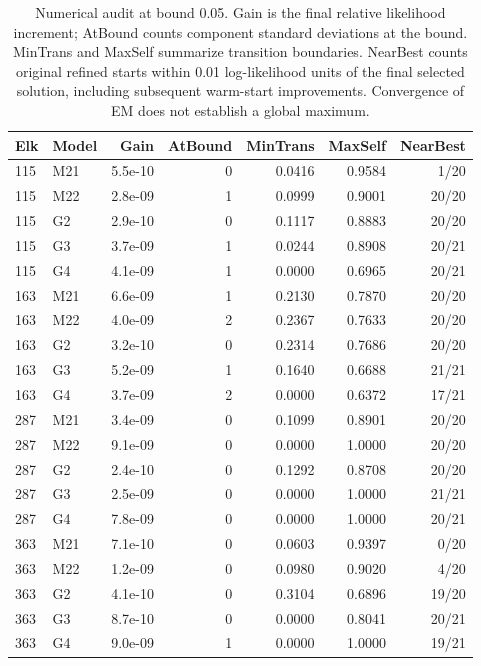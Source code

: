 \begin{table}[tbp]
\centering\small
\caption{Numerical audit at bound 0.05. Gain is the final relative likelihood increment; AtBound counts component standard deviations at the bound. MinTrans and MaxSelf summarize transition boundaries. NearBest counts original refined starts within 0.01 log-likelihood units of the final selected solution, including subsequent warm-start improvements. Convergence of EM does not establish a global maximum.}\label{tab:si-convergence}
\begin{tabular}{llrrrrr}\toprule
Elk & Model & Gain & AtBound & MinTrans & MaxSelf & NearBest \\\midrule
115 & M21 & 5.5e-10 & 0 & 0.0416 & 0.9584 & 1/20 \\
115 & M22 & 2.8e-09 & 1 & 0.0999 & 0.9001 & 20/20 \\
115 & G2 & 2.9e-10 & 0 & 0.1117 & 0.8883 & 20/20 \\
115 & G3 & 3.7e-09 & 1 & 0.0244 & 0.8908 & 20/21 \\
115 & G4 & 4.1e-09 & 1 & 0.0000 & 0.6965 & 20/21 \\
163 & M21 & 6.6e-09 & 1 & 0.2130 & 0.7870 & 20/20 \\
163 & M22 & 4.0e-09 & 2 & 0.2367 & 0.7633 & 20/20 \\
163 & G2 & 3.2e-10 & 0 & 0.2314 & 0.7686 & 20/20 \\
163 & G3 & 5.2e-09 & 1 & 0.1640 & 0.6688 & 21/21 \\
163 & G4 & 3.7e-09 & 2 & 0.0000 & 0.6372 & 17/21 \\
287 & M21 & 3.4e-09 & 0 & 0.1099 & 0.8901 & 20/20 \\
287 & M22 & 9.1e-09 & 0 & 0.0000 & 1.0000 & 20/20 \\
287 & G2 & 2.4e-10 & 0 & 0.1292 & 0.8708 & 20/20 \\
287 & G3 & 2.5e-09 & 0 & 0.0000 & 1.0000 & 21/21 \\
287 & G4 & 7.8e-09 & 0 & 0.0000 & 1.0000 & 20/21 \\
363 & M21 & 7.1e-10 & 0 & 0.0603 & 0.9397 & 0/20 \\
363 & M22 & 1.2e-09 & 0 & 0.0980 & 0.9020 & 4/20 \\
363 & G2 & 4.1e-10 & 0 & 0.3104 & 0.6896 & 19/20 \\
363 & G3 & 8.7e-10 & 0 & 0.0000 & 0.8041 & 20/21 \\
363 & G4 & 9.0e-09 & 1 & 0.0000 & 1.0000 & 19/21 \\
\bottomrule\end{tabular}
\end{table}
